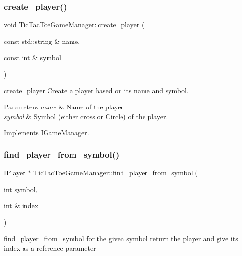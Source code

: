 \subsubsection{\texorpdfstring{create\+\_\+player()}{create\_player()}}
{\footnotesize\ttfamily void Tic\+Tac\+Toe\+Game\+Manager\+::create\+\_\+player (\begin{DoxyParamCaption}\item[{const std\+::string \&}]{name,  }\item[{const int \&}]{symbol }\end{DoxyParamCaption})\hspace{0.3cm}{\ttfamily [virtual]}}



create\+\_\+player Create a player based on its name and symbol. 


\begin{DoxyParams}{Parameters}
{\em name} & Name of the player \\
\hline
{\em symbol} & Symbol (either cross or Circle) of the player. \\
\hline
\end{DoxyParams}


Implements \hyperlink{class_i_game_manager_a197ed85a1deadeb414b3030e11d0bf1e}{I\+Game\+Manager}.

\mbox{\label{class_tic_tac_toe_game_manager_a791389179603563f9c90a25aa173ceb4}} 
\subsubsection{\texorpdfstring{find\+\_\+player\+\_\+from\+\_\+symbol()}{find\_player\_from\_symbol()}}
{\footnotesize\ttfamily \hyperlink{class_i_player}{I\+Player} $\ast$ Tic\+Tac\+Toe\+Game\+Manager\+::find\+\_\+player\+\_\+from\+\_\+symbol (\begin{DoxyParamCaption}\item[{int}]{symbol,  }\item[{int \&}]{index }\end{DoxyParamCaption})}



find\+\_\+player\+\_\+from\+\_\+symbol for the given symbol return the player and give its index as a reference parameter. 


